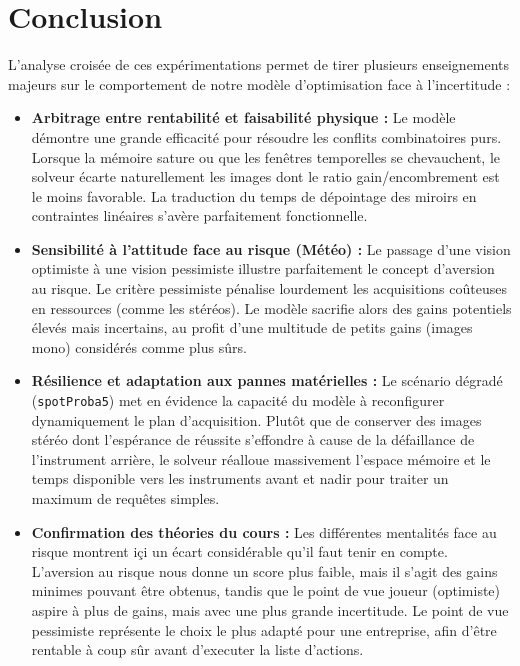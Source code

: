 \documentclass[8pt]{article}
\begin{document}
\section{Conclusion}

L'analyse croisée de ces expérimentations permet de tirer plusieurs enseignements majeurs sur le comportement de notre modèle d'optimisation face à l'incertitude :

\begin{itemize}
    \item \textbf{Arbitrage entre rentabilité et faisabilité physique :} 
    Le modèle démontre une grande efficacité pour résoudre les conflits combinatoires purs. Lorsque la mémoire sature ou que les fenêtres temporelles se chevauchent, le solveur écarte naturellement les images dont le ratio gain/encombrement est le moins favorable. La traduction du temps de dépointage des miroirs en contraintes linéaires s'avère parfaitement fonctionnelle.
    
    \item \textbf{Sensibilité à l'attitude face au risque (Météo) :} 
    Le passage d'une vision optimiste à une vision pessimiste illustre parfaitement le concept d'aversion au risque. Le critère pessimiste  pénalise lourdement les acquisitions coûteuses en ressources (comme les stéréos). Le modèle sacrifie alors des gains potentiels élevés mais incertains, au profit d'une multitude de petits gains (images mono) considérés comme plus sûrs.
    
    \item \textbf{Résilience et adaptation aux pannes matérielles :} 
    Le scénario dégradé (\texttt{spotProba5}) met en évidence la capacité du modèle à reconfigurer dynamiquement le plan d'acquisition. Plutôt que de conserver des images stéréo dont l'espérance de réussite s'effondre à cause de la défaillance de l'instrument arrière, le solveur réalloue massivement l'espace mémoire et le temps disponible vers les instruments avant et nadir pour traiter un maximum de requêtes simples.

    \item \textbf{Confirmation des théories du cours :}
    Les différentes mentalités face au risque montrent içi un écart considérable qu'il faut tenir en compte. L'aversion au risque nous donne un score plus faible, mais il s'agit des gains minimes pouvant être obtenus, tandis que le point de vue joueur (optimiste) aspire à plus de gains, mais avec une plus grande incertitude. Le point de vue pessimiste représente le choix le plus adapté pour une entreprise, afin d'être rentable à coup sûr avant d'executer la liste d'actions.
    
\end{itemize}
\end{document}
